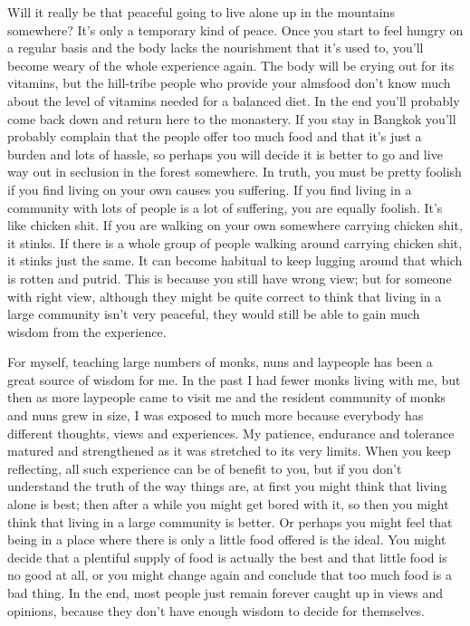 Will it really be that peaceful going to live alone up in the mountains somewhere? It's only a temporary kind of peace. Once you start to feel hungry on a regular basis and the body lacks the nourishment that it's used to, you'll become weary of the whole experience again. The body will be crying out for its vitamins, but the hill-tribe people who provide your almsfood don't know much about the level of vitamins needed for a balanced diet. In the end you'll probably come back down and return here to the monastery. If you stay in Bangkok you'll probably complain that the people offer too much food and that it's just a burden and lots of hassle, so perhaps you will decide it is better to go and live way out in seclusion in the forest somewhere. In truth, you must be pretty foolish if you find living on your own causes you suffering. If you find living in a community with lots of people is a lot of suffering, you are equally foolish. It's like chicken shit. If you are walking on your own somewhere carrying chicken shit, it stinks. If there is a whole group of people walking around carrying chicken shit, it stinks just the same. It can become habitual to keep lugging around that which is rotten and putrid. This is because you still have wrong view; but for someone with right view, although they might be quite correct to think that living in a large community isn't very peaceful, they would still be able to gain much wisdom from the experience. 

For myself, teaching large numbers of monks, nuns and laypeople has been a great source of wisdom for me. In the past I had fewer monks living with me, but then as more laypeople came to visit me and the resident community of monks and nuns grew in size, I was exposed to much more because everybody has different thoughts, views and experiences. My patience, endurance and tolerance matured and strengthened as it was stretched to its very limits. When you keep reflecting, all such experience can be of benefit to you, but if you don't understand the truth of the way things are, at first you might think that living alone is best; then after a while you might get bored with it, so then you might think that living in a large community is better. Or perhaps you might feel that being in a place where there is only a little food offered is the ideal. You might decide that a plentiful supply of food is actually the best and that little food is no good at all, or you might change again and conclude that too much food is a bad thing. In the end, most people just remain forever caught up in views and opinions, because they don't have enough wisdom to decide for themselves.

